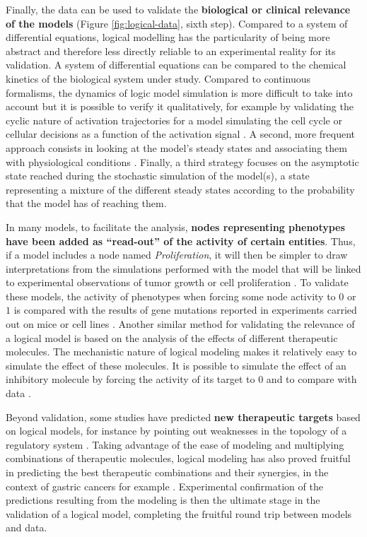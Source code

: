 \documentclass[a4paper,12pt,twoside,onecolumn,openright,final,oldfontcommands]{memoir}
\begin{document}
Finally, the data can be used to validate the \textbf{biological or
clinical relevance of the models} (Figure \ref{fig:logical-data}, sixth
step). Compared to a system of differential equations, logical modelling
has the particularity of being more abstract and therefore less directly
reliable to an experimental reality for its validation. A system of
differential equations can be compared to the chemical kinetics of the
biological system under study. Compared to continuous formalisms, the
dynamics of logic model simulation is more difficult to take into
account but it is possible to verify it qualitatively, for example by
validating the cyclic nature of activation trajectories for a model
simulating the cell cycle \citep{faure2006dynamical} or cellular
decisions as a function of the activation signal
\citep{calzone2010mathematical}. A second, more frequent approach
consists in looking at the model's steady states and associating them
with physiological conditions
\citep[\citet{cohen2015mathematical}]{weinstein2017network}. Finally, a
third strategy focuses on the asymptotic state reached during the
stochastic simulation of the model(s), a state representing a mixture of
the different steady states according to the probability that the model
has of reaching them.

In many models, to facilitate the analysis, \textbf{nodes representing
phenotypes have been added as ``read-out'' of the activity of certain
entities}. Thus, if a model includes a node named \emph{Proliferation},
it will then be simpler to draw interpretations from the simulations
performed with the model that will be linked to experimental
observations of tumor growth or cell proliferation
\citep{grieco2013integrative, steinway2015combinatorial}. To validate
these models, the activity of phenotypes when forcing some node activity
to \(0\) or \(1\) is compared with the results of gene mutations
reported in experiments carried out on mice or cell lines
\citep{faure2006dynamical, cohen2015mathematical}. Another similar
method for validating the relevance of a logical model is based on the
analysis of the effects of different therapeutic molecules. The
mechanistic nature of logical modeling makes it relatively easy to
simulate the effect of these molecules. It is possible to simulate the
effect of an inhibitory molecule by forcing the activity of its target
to 0 and to compare with data
\citep{zanudo2017network, iorio2016landscape, knijnenburg2016logic}.

Beyond validation, some studies have predicted \textbf{new therapeutic
targets} based on logical models, for instance by pointing out
weaknesses in the topology of a regulatory system
\citep{sahin2009modeling}. Taking advantage of the ease of modeling and
multiplying combinations of therapeutic molecules, logical modeling has
also proved fruitful in predicting the best therapeutic combinations and
their synergies, in the context of gastric cancers for example
\citep{flobak2015discovery}. Experimental confirmation of the
predictions resulting from the modeling is then the ultimate stage in
the validation of a logical model, completing the fruitful round trip
between models and data.
\end{document}
